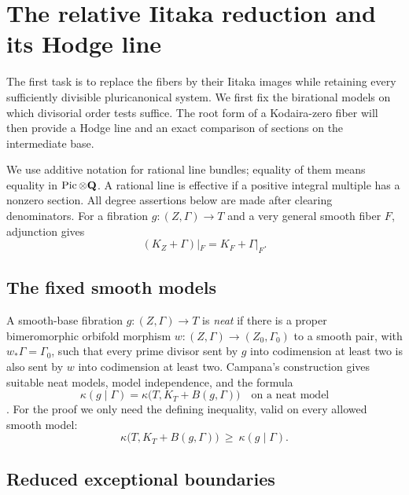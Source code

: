 \section{The relative Iitaka reduction and its Hodge line}
\label{setup:section}

The first task is to replace the fibers by their Iitaka images while
retaining every sufficiently divisible pluricanonical system. We first
fix the birational models on which divisorial order tests suffice. The
root form of a Kodaira-zero fiber will then provide a Hodge line and an
exact comparison of sections on the intermediate base.

We use additive notation for rational line bundles; equality of them
means equality in $\operatorname{Pic}\otimes\mathbf Q$. A rational line is
effective if a positive integral multiple has a nonzero section.
All degree assertions below are made after clearing denominators.
For a fibration $g:(Z,\Gamma)\to T$ and a very general smooth
fiber $F$, adjunction gives
\begin{equation}\label{setup:fiber-adjunction}
 (K_Z+\Gamma)|_F=K_F+\Gamma|_F.
\end{equation}

\subsection{The fixed smooth models}

A smooth-base fibration $g:(Z,\Gamma)\to T$ is \emph{neat} if there is a
proper bimeromorphic orbifold morphism
$w:(Z,\Gamma)\to(Z_0,\Gamma_0)$ to a smooth pair, with
$w_*\Gamma=\Gamma_0$, such that every prime divisor sent by $g$ into
codimension at least two is also sent by $w$ into codimension at least
two. Campana's construction gives suitable neat models, model
independence, and the formula
\begin{equation}\label{setup:neat-formula}
 \kappa(g\mid\Gamma)=\kappa\bigl(T,K_T+B(g,\Gamma)\bigr)
 \quad\text{on a neat model}
\end{equation}
\cite[Definition~3.8, Proposition~3.10, Corollary~4.11, and
Remark~6.2]{CampanaOrbifolds}.
For the proof we only need the defining inequality, valid on every
allowed smooth model:
\begin{equation}\label{setup:base-comparison}
 \kappa\bigl(T,K_T+B(g,\Gamma)\bigr)
 \ \geq\ \kappa(g\mid\Gamma).
\end{equation}

\subsection{Reduced exceptional boundaries}

